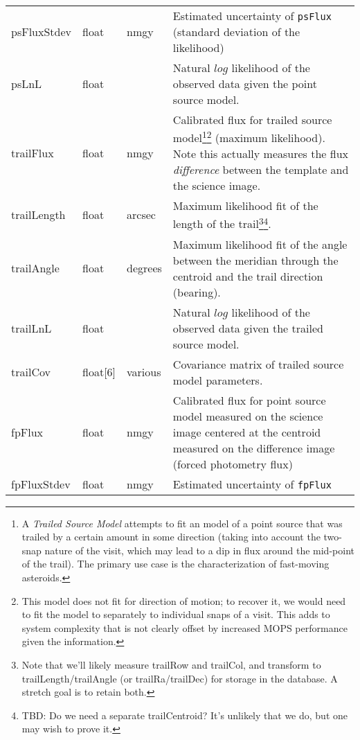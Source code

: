 \documentclass[12pt]{article}
\begin{document}
\begin{center}
\begin{longtable}{p{3cm}p{2cm}p{2cm}p{5cm}}
psFluxStdev & float & nmgy & Estimated uncertainty of \texttt{psFlux} (standard deviation of the likelihood) \\

psLnL & float & ~ & Natural $log$ likelihood of the observed data given the point source model. \\ 

trailFlux & float & nmgy & Calibrated flux for trailed source model\footnote{A {\em Trailed Source Model} attempts to fit an model of a point source that was trailed by a certain amount in some direction (taking into account the two-snap nature of the visit, which may lead to a dip in flux around the mid-point of the trail). The primary use case is the characterization of fast-moving asteroids.}\footnote{This model does not fit for direction of motion; to recover it, we would need to fit the model to separately to individual snaps of a visit. This adds to system complexity that is not clearly offset by increased MOPS performance given the information.} (maximum likelihood). Note this actually measures the flux {\em difference} between the template and the science image. \\ 

trailLength & float & arcsec & Maximum likelihood fit of the length of the trail\footnote{Note that we'll likely measure trailRow and trailCol, and transform to trailLength/trailAngle (or trailRa/trailDec) for storage in the database. A stretch goal is to retain both.}\footnote{TBD: Do we need a separate trailCentroid? It's unlikely that we do, but one may wish to prove it.}. \\ 

trailAngle & float & degrees & Maximum likelihood fit of the angle between the meridian through the centroid and the trail direction (bearing). \\ 

trailLnL & float & ~ & Natural $log$ likelihood of the observed data given the trailed source model. \\ 

trailCov & float[6] & various & Covariance matrix of trailed source model parameters. \\ 

fpFlux & float & nmgy & Calibrated flux for point source model measured on the science image centered at the centroid measured on the difference image (forced photometry flux) \\ 

fpFluxStdev & float & nmgy & Estimated uncertainty of \texttt{fpFlux} \\ 


\end{longtable}
\end{center}
\end{document}
